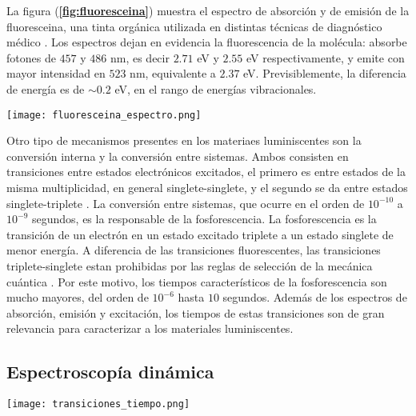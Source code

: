 \noindent La figura (\textbf{\ref{fig:fluoresceina}}) muestra el espectro de absorción y de emisión de la fluoresceina, una tinta orgánica utilizada en distintas técnicas de diagnóstico médico \cite{fluoresceina_1,fluoresceina_2}.
Los espectros dejan en evidencia la fluorescencia de la molécula: absorbe fotones de $457$ y $486$ nm, es decir $2.71$ eV y $2.55$ eV respectivamente, y emite con mayor intensidad en $523$ nm, equivalente a $2.37$ eV.
Previsiblemente, la diferencia de energía es de $\sim 0.2$ eV, en el rango de energías vibracionales.


\begin{SCfigure}
    \centering
    \texttt{[image: fluoresceina\_espectro.png]}
    \caption{\textbf{Espectro de la Fluoresceina} diluida en etanol, tanto de absorción (azul) como de emisión (rojo). El cuadro muestra los picos de absorción en $\lambda_{abs}=457$ nm y 486 nm, y de emisión en $\lambda_{em}$ = 523 nm. Tomada y adaptada de \cite{kristoffersen_testing_2018}.}
    \label{fig:fluoresceina}
\end{SCfigure}

Otro tipo de mecanismos presentes en los materiaes luminiscentes son la conversión interna y la conversión entre sistemas.
Ambos consisten en transiciones entre estados electrónicos excitados, el primero es entre estados de la misma multiplicidad, en general singlete-singlete, y el segundo se da entre estados singlete-triplete \cite{valeur_characteristics_2012}.
La conversión entre sistemas, que ocurre en el orden de $10^{-10}$ a $10^{-9}$ segundos, es la responsable de la fosforescencia.
La fosforescencia es la transición de un electrón en un estado excitado triplete a un estado singlete de menor energía.
A diferencia de las transiciones fluorescentes, las transiciones triplete-singlete estan prohibidas por las reglas de selección de la mecánica cuántica \cite{demtroder_emission_2010}.
Por este motivo, los tiempos característicos de la fosforescencia son mucho mayores, del orden de $10^{-6}$ hasta $10$ segundos.
Además de los espectros de absorción, emisión y excitación, los tiempos de estas transiciones son de gran relevancia para caracterizar a los materiales luminiscentes.

\subsection{Espectroscopía dinámica}

\begin{SCfigure}
    \centering
    \texttt{[image: transiciones\_tiempo.png]}
    \caption{\textbf{Diagrama de Jablonski} con transiciones que contribuyen al tiempo de vida.\textbf{(A)} Sólo transiciones de fluorescencia. \textbf{(B)} Transiciones de fluorescencia y choques. Tomado y adaptado de \cite{demtroder_emission_2010}.}
    \label{fig:transiciones_tiempo}
\end{SCfigure}


